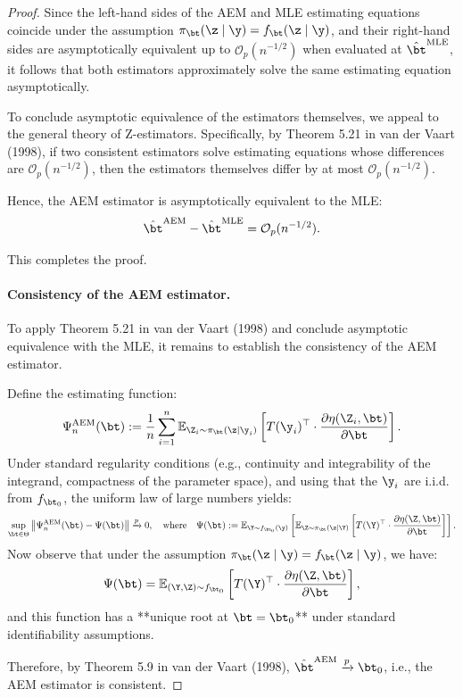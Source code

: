 \begin{proof}
{\color{red}
Since the left-hand sides of the AEM and MLE estimating equations coincide under the assumption \( \pi_\bt(\z \mid \y) = f_\bt(\z \mid \y) \), and their right-hand sides are asymptotically equivalent up to \( \mathcal{O}_p(n^{-1/2}) \) when evaluated at \( \hat\bt^{\text{MLE}} \), it follows that both estimators approximately solve the same estimating equation asymptotically.

To conclude asymptotic equivalence of the estimators themselves, we appeal to the general theory of Z-estimators. Specifically, by Theorem 5.21 in van der Vaart (1998), if two consistent estimators solve estimating equations whose differences are \( \mathcal{O}_p(n^{-1/2}) \), then the estimators themselves differ by at most \( \mathcal{O}_p(n^{-1/2}) \).

Hence, the AEM estimator is asymptotically equivalent to the MLE:
\[
\hat\bt^{\text{AEM}} - \hat\bt^{\text{MLE}} = \mathcal{O}_p(n^{-1/2}).
\]

This completes the proof.

}


{\color{blue}
\paragraph{Consistency of the AEM estimator.}
To apply Theorem 5.21 in van der Vaart (1998) and conclude asymptotic equivalence with the MLE, it remains to establish the consistency of the AEM estimator.

Define the estimating function:
\[
\Psi_n^{\text{AEM}}(\bt) := \frac{1}{n} \sum_{i=1}^n \mathbb{E}_{\Z_i \sim \pi_\bt(\z \mid \y_i)} \left[ T(\y_i)^\top \cdot \frac{\partial \eta(\Z_i, \bt)}{\partial \bt} \right].
\]
Under standard regularity conditions (e.g., continuity and integrability of the integrand, compactness of the parameter space), and using that the \( \y_i \) are i.i.d. from \( f_{\bt_0} \), the uniform law of large numbers yields:
\[
\sup_{\bt \in \Theta} \left\| \Psi_n^{\text{AEM}}(\bt) - \Psi(\bt) \right\| \xrightarrow{p} 0,
\quad \text{where} \quad
\Psi(\bt) := \mathbb{E}_{\Y \sim f_{\bt_0}(\y)} \left[ \mathbb{E}_{\Z \sim \pi_\bt(\z \mid \Y)} \left[ T(\Y)^\top \cdot \frac{\partial \eta(\Z, \bt)}{\partial \bt} \right] \right].
\]
Now observe that under the assumption \( \pi_\bt(\z \mid \y) = f_\bt(\z \mid \y) \), we have:
\[
\Psi(\bt) = \mathbb{E}_{(\Y, \Z) \sim f_{\bt_0}} \left[ T(\Y)^\top \cdot \frac{\partial \eta(\Z, \bt)}{\partial \bt} \right],
\]
and this function has a **unique root at \( \bt = \bt_0 \)** under standard identifiability assumptions.

Therefore, by Theorem 5.9 in van der Vaart (1998), \( \hat\bt^{\text{AEM}} \xrightarrow{p} \bt_0 \), i.e., the AEM estimator is consistent.

}
\end{proof}





